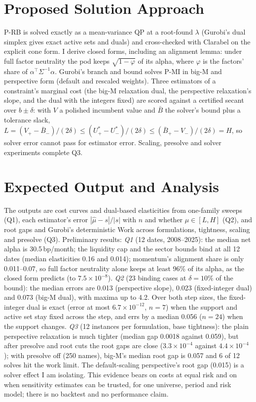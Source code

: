 \documentclass[11pt]{article}
\newcommand{\T}{^{\top}}
\begin{document}
\section{Proposed Solution Approach}
P-RB is solved exactly as a mean-variance QP at a root-found $\lambda$ (Gurobi's dual simplex gives exact active sets and duals) and cross-checked with Clarabel on the explicit cone form. I derive closed forms, including an alignment lemma: under full factor neutrality the pod keeps $\sqrt{1-\varphi}$ of its alpha, where $\varphi$ is the factors' share of $\alpha\T\Sigma^{-1}\alpha$. Gurobi's branch and bound solves P-MI in big-M and perspective form (default and rescaled weights). Three estimators of a constraint's marginal cost (the big-M relaxation dual, the perspective relaxation's slope, and the dual with the integers fixed) are scored against a certified secant over $b\pm\delta$: with $V$ a polished incumbent value and $\bar B$ the solver's bound plus a tolerance slack, $L=(V_+-\bar B_-)/(2\delta)\le(U^*_+-U^*_-)/(2\delta)\le(\bar B_+-V_-)/(2\delta)=H$, so solver error cannot pass for estimator error. Scaling, presolve and solver experiments complete Q3.

\section{Expected Output and Analysis}
The outputs are cost curves and dual-based elasticities from one-family sweeps (Q1), each estimator's error $|\hat\mu-s|/|s|$ with $n$ and whether $\hat\mu\in[L,H]$ (Q2), and root gaps and Gurobi's deterministic Work across formulations, tightness, scaling and presolve (Q3). Preliminary results: \emph{Q1} (12 dates, 2008--2025): the median net alpha is 30.5\,bp/month; the liquidity cap and the sector bounds bind at all 12 dates (median elasticities 0.16 and 0.014); momentum's alignment share is only 0.011--0.07, so full factor neutrality alone keeps at least 96\% of its alpha, as the closed form predicts (to $7.5\times10^{-8}$). \emph{Q2} (23 binding cases at $\delta=10\%$ of the bound): the median errors are 0.013 (perspective slope), 0.023 (fixed-integer dual) and 0.073 (big-M dual), with maxima up to 4.2. Over both step sizes, the fixed-integer dual is exact (error at most $6.7\times10^{-12}$, $n=7$) when the support and active set stay fixed across the step, and errs by a median 0.056 ($n=24$) when the support changes. \emph{Q3} (12 instances per formulation, base tightness): the plain perspective relaxation is much tighter (median gap 0.0018 against 0.059), but after presolve and root cuts the root gaps are close ($3.3\times10^{-4}$ against $4.4\times10^{-4}$); with presolve off (250 names), big-M's median root gap is 0.057 and 6 of 12 solves hit the work limit. The default-scaling perspective's root gap (0.015) is a solver effect I am isolating. This evidence bears on costs at equal risk and on when sensitivity estimates can be trusted, for one universe, period and risk model; there is no backtest and no performance claim.
\end{document}
